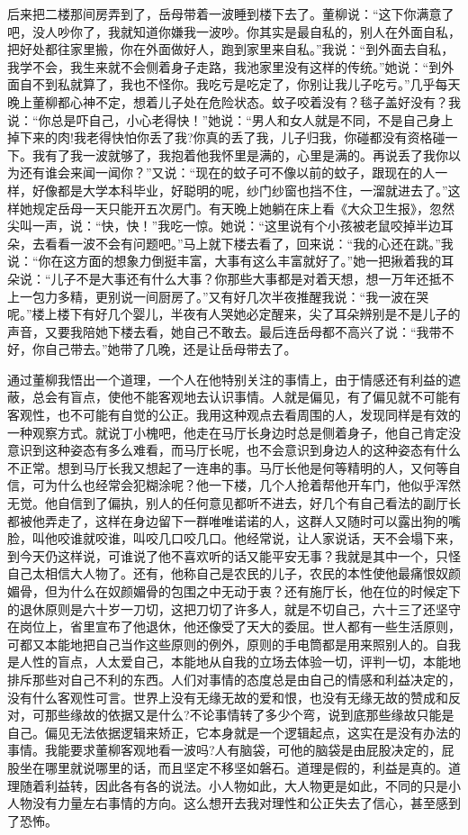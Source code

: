 \documentclass[12pt,oneside]{book}
\begin{document}
后来把二楼那间房弄到了，岳母带着一波睡到楼下去了。董柳说：``这下你满意了吧，没人吵你了，我就知道你嫌我一波吵。你其实是最自私的，别人在外面自私，把好处都往家里搬，你在外面做好人，跑到家里来自私。''我说：``到外面去自私，我学不会，我生来就不会侧着身子走路，我池家里没有这样的传统。''她说：``到外面自不到私就算了，我也不怪你。我吃亏是吃定了，你别让我儿子吃亏。''几乎每天晚上董柳都心神不定，想着儿子处在危险状态。蚊子咬着没有？毯子盖好没有？我说：``你总是吓自己，小心老得快！''她说：``男人和女人就是不同，不是自己身上掉下来的肉!我老得快怕你丢了我?你真的丢了我，儿子归我，你碰都没有资格碰一下。我有了我一波就够了，我抱着他我怀里是满的，心里是满的。再说丢了我你以为还有谁会来闻一闻你？''又说：``现在的蚊子可不像以前的蚊子，跟现在的人一样，好像都是大学本科毕业，好聪明的呢，纱门纱窗也挡不住，一溜就进去了。''这样她规定岳母一天只能开五次房门。有天晚上她躺在床上看《大众卫生报》，忽然尖叫一声，说：``快，快！''我吃一惊。她说：``这里说有个小孩被老鼠咬掉半边耳朵，去看看一波不会有问题吧。''马上就下楼去看了，回来说：``我的心还在跳。''我说：``你在这方面的想象力倒挺丰富，大事有这么丰富就好了。''她一把揪着我的耳朵说：``儿子不是大事还有什么大事？你那些大事都是对着天想，想一万年还抵不上一包力多精，更别说一间厨房了。''又有好几次半夜推醒我说：``我一波在哭呢。''楼上楼下有好几个婴儿，半夜有人哭她必定醒来，尖了耳朵辨别是不是儿子的声音，又要我陪她下楼去看，她自己不敢去。最后连岳母都不高兴了说：``我带不好，你自己带去。''她带了几晚，还是让岳母带去了。

通过董柳我悟出一个道理，一个人在他特别关注的事情上，由于情感还有利益的遮蔽，总会有盲点，使他不能客观地去认识事情。人就是偏见，有了偏见就不可能有客观性，也不可能有自觉的公正。我用这种观点去看周围的人，发现同样是有效的一种观察方式。就说丁小槐吧，他走在马厅长身边时总是侧着身子，他自己肯定没意识到这种姿态有多么难看，而马厅长呢，也不会意识到身边人的这种姿态有什么不正常。想到马厅长我又想起了一连串的事。马厅长他是何等精明的人，又何等自信，可为什么也经常会犯糊涂呢？他一下楼，几个人抢着帮他开车门，他似乎浑然无觉。他自信到了偏执，别人的任何意见都听不进去，好几个有自己看法的副厅长都被他弄走了，这样在身边留下一群唯唯诺诺的人，这群人又随时可以露出狗的嘴脸，叫他咬谁就咬谁，叫咬几口咬几口。他经常说，让人家说话，天不会塌下来，到今天仍这样说，可谁说了他不喜欢听的话又能平安无事？我就是其中一个，只怪自己太相信大人物了。还有，他称自己是农民的儿子，农民的本性使他最痛恨奴颜媚骨，但为什么在奴颜媚骨的包围之中无动于衷？还有施厅长，他在位的时候定下的退休原则是六十岁一刀切，这把刀切了许多人，就是不切自己，六十三了还坚守在岗位上，省里宣布了他退休，他还像受了天大的委屈。世人都有一些生活原则，可都又本能地把自己当作这些原则的例外，原则的手电筒都是用来照别人的。自我是人性的盲点，人太爱自己，本能地从自我的立场去体验一切，评判一切，本能地排斥那些对自己不利的东西。人们对事情的态度总是由自己的情感和利益决定的，没有什么客观性可言。世界上没有无缘无故的爱和恨，也没有无缘无故的赞成和反对，可那些缘故的依据又是什么?不论事情转了多少个弯，说到底那些缘故只能是自己。偏见无法依据逻辑来矫正，它本身就是一个逻辑起点，这实在是没有办法的事情。我能要求董柳客观地看一波吗?人有脑袋，可他的脑袋是由屁股决定的，屁股坐在哪里就说哪里的话，而且坚定不移坚如磐石。道理是假的，利益是真的。道理随着利益转，因此各有各的说法。小人物如此，大人物更是如此，不同的只是小人物没有力量左右事情的方向。这么想开去我对理性和公正失去了信心，甚至感到了恐怖。
\end{document}
